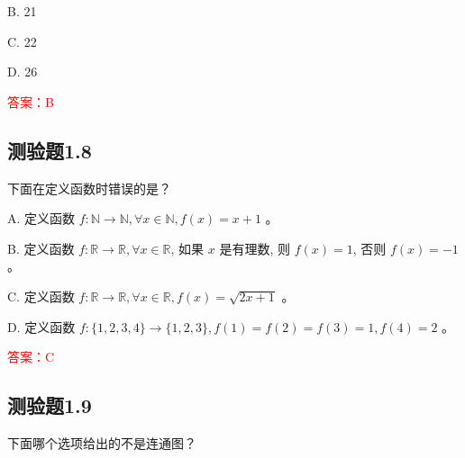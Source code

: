 \documentclass[UTF8, heading=true]{ctexart}
\begin{document}
B. 21

C. 22

D. 26

\textcolor{red}{答案：B}

\subsection{测验题1.8}

下面在定义函数时错误的是？

A. 定义函数 $f: \mathbb{N} \rightarrow \mathbb{N}, \forall x \in \mathbb{N}, f(x)=x+1$ 。

B. 定义函数 $f: \mathbb{R} \rightarrow \mathbb{R}, \forall x \in \mathbb{R}$, 如果 $x$ 是有理数, 则 $f(x)=1$, 否则 $f(x)=-1$ 。

C. 定义函数 $f: \mathbb{R} \rightarrow \mathbb{R}, \forall x \in \mathbb{R}, f(x)=\sqrt{2 x+1}$ 。

D. 定义函数 $f:\{1,2,3,4\} \rightarrow\{1,2,3\}, f(1)=f(2)=f(3)=1, f(4)=2$ 。

\textcolor{red}{答案：C}

\subsection{测验题1.9}

下面哪个选项给出的不是连通图？
\end{document}
